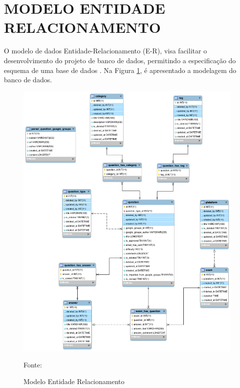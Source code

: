 \section{MODELO ENTIDADE RELACIONAMENTO}

O modelo de dados Entidade-Relacionamento (E-R), visa facilitar o
desenvolvimento do projeto de banco de dados, permitindo a
especificação do esquema de uma base de dados \cite{sistemaDeBancoDeDados}. Na 
Figura \ref{fig:modeloEntidadeRelacionamento}, é apresentado a modelagem do 
banco de dados.

\begin{figure}[h!tb]
	\caption{Modelo Entidade Relacionamento}
	\label{fig:modeloEntidadeRelacionamento}

	\centering
	\includegraphics[width=\textwidth]{images/zcpe-reverse-engineer-database.png}

	\centering
	\footnotesize Fonte: \fonteOAutor
\end{figure}

\FloatBarrier 	%
